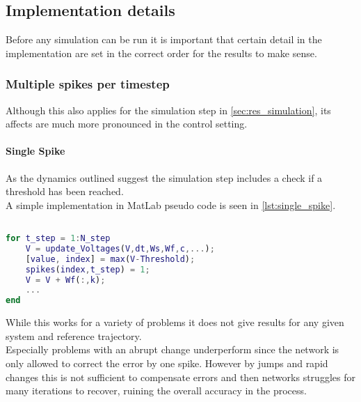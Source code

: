\subsection{Implementation details}
Before any simulation can be run it is important that certain detail in the implementation are set in the correct order for the results to make sense.


\subsubsection{Multiple spikes per timestep}
Although this also applies for the simulation step in \cref{sec:res_simulation}, its affects are much more pronounced in the control setting.\\
\paragraph{Single Spike}
As the dynamics outlined suggest the simulation step includes a check if a threshold has been reached. \\
A simple implementation in MatLab pseudo code is seen in \cref{lst:single_spike}.

\begin{lstlisting}[language=Matlab, caption=Single spike implementation,label=lst:single_spike]

for t_step = 1:N_step
	V = update_Voltages(V,dt,Ws,Wf,c,...);
	[value, index] = max(V-Threshold);
	spikes(index,t_step) = 1;
	V = V + Wf(:,k);
	...
end
\end{lstlisting}
While this works for a variety of problems it does not give results for any given system and reference trajectory.\\
Especially problems with an abrupt change underperform since the network is only allowed to correct the error by one spike. However by jumps and rapid changes this is not sufficient to compensate errors and then networks struggles for many iterations to recover, ruining the overall accuracy in the process.\\
